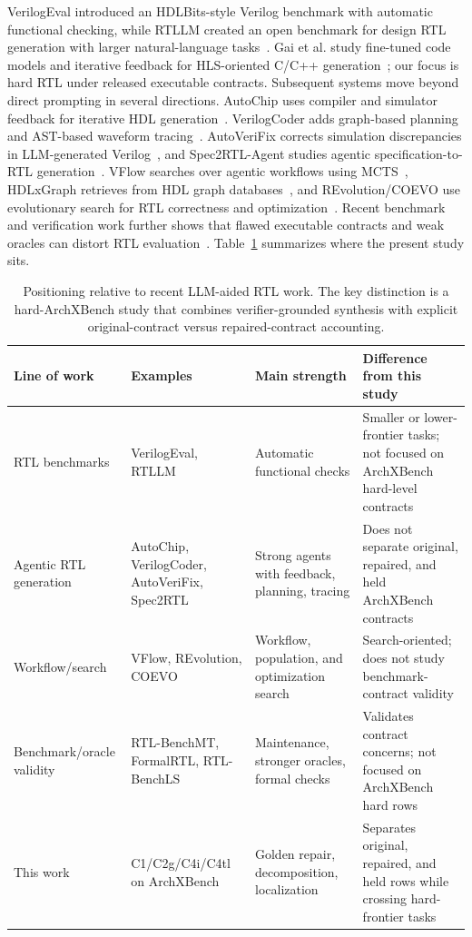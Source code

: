 \documentclass[sigconf,anonymous]{acmart}
\newcommand{\arch}{ArchXBench\xspace}
\newcommand{\cOne}{C1\xspace}
\newcommand{\cTwoG}{C2g\xspace}
\newcommand{\cFourI}{C4i\xspace}
\newcommand{\cFourTL}{C4tl\xspace}
\begin{document}
VerilogEval introduced an HDLBits-style Verilog benchmark with automatic functional checking, while RTLLM created an open benchmark for design RTL generation with larger natural-language tasks~\cite{liu2023verilogeval,lu2023rtllm}.
Gai et al. study fine-tuned code models and iterative feedback for HLS-oriented C/C++ generation~\cite{gai2025hls}; our focus is hard RTL under released executable contracts.
Subsequent systems move beyond direct prompting in several directions.
AutoChip uses compiler and simulator feedback for iterative HDL generation~\cite{thakur2024autochip}.
VerilogCoder adds graph-based planning and AST-based waveform tracing~\cite{ho2024verilogcoder}.
AutoVeriFix corrects simulation discrepancies in LLM-generated Verilog~\cite{tan2025autoverifix}, and Spec2RTL-Agent studies agentic specification-to-RTL generation~\cite{spec2rtlagent2025}.
VFlow searches over agentic workflows using MCTS~\cite{wei2025vflow}, HDLxGraph retrieves from HDL graph databases~\cite{zheng2025hdlxgraph}, and REvolution/COEVO use evolutionary search for RTL correctness and optimization~\cite{min2025revolution,ping2026coevo}.
Recent benchmark and verification work further shows that flawed executable contracts and weak oracles can distort RTL evaluation~\cite{wang2026rtlbenchmt,li2026formalrtl,wang2026rtlbenchls}.
Table~\ref{tab:positioning} summarizes where the present study sits.

\begin{table}[t]
\centering
\caption{Positioning relative to recent LLM-aided RTL work. The key distinction is a hard-\arch study that combines verifier-grounded synthesis with explicit original-contract versus repaired-contract accounting.}
\label{tab:positioning}
\footnotesize
\setlength{\tabcolsep}{3.4pt}
\renewcommand{\arraystretch}{1.08}
\begin{tabular}{p{2.6cm}p{3.4cm}p{3.0cm}p{5.0cm}}
\toprule
Line of work & Examples & Main strength & Difference from this study \\
\midrule
RTL benchmarks & VerilogEval, RTLLM & Automatic functional checks & Smaller or lower-frontier tasks; not focused on \arch hard-level contracts \\
Agentic RTL generation & AutoChip, VerilogCoder, AutoVeriFix, Spec2RTL & Strong agents with feedback, planning, tracing & Does not separate original, repaired, and held \arch contracts \\
Workflow/search & VFlow, REvolution, COEVO & Workflow, population, and optimization search & Search-oriented; does not study benchmark-contract validity \\
Benchmark/oracle validity & RTL-BenchMT, FormalRTL, RTL-BenchLS & Maintenance, stronger oracles, formal checks & Validates contract concerns; not focused on \arch hard rows \\
This work & \cOne/\cTwoG/\cFourI/\cFourTL on \arch & Golden repair, decomposition, localization & Separates original, repaired, and held rows while crossing hard-frontier tasks \\
\bottomrule
\end{tabular}
\renewcommand{\arraystretch}{1.0}
\end{table}
\end{document}

